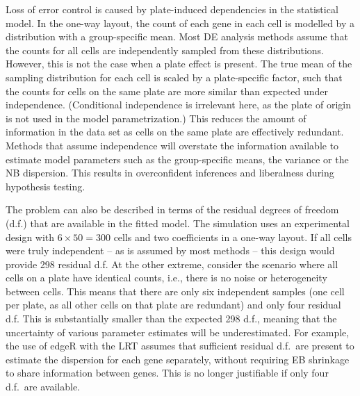 \documentclass[oupdraft]{bio}
\begin{document}
Loss of error control is caused by plate-induced dependencies in the statistical model.
In the one-way layout, the count of each gene in each cell is modelled by a distribution with a group-specific mean.
Most DE analysis methods assume that the counts for all cells are independently sampled from these distributions.
However, this is not the case when a plate effect is present.
The true mean of the sampling distribution for each cell is scaled by a plate-specific factor, 
    such that the counts for cells on the same plate are more similar than expected under independence.
(Conditional independence is irrelevant here, as the plate of origin is not used in the model parametrization.)
This reduces the amount of information in the data set as cells on the same plate are effectively redundant.
Methods that assume independence will overstate the information available to estimate model parameters such as the group-specific means, the variance or the NB dispersion.
This results in overconfident inferences and liberalness during hypothesis testing.

The problem can also be described in terms of the residual degrees of freedom (d.f.) that are available in the fitted model.
The simulation uses an experimental design with $6 \times 50 =  300$ cells and two coefficients in a one-way layout.
If all cells were truly independent -- as is assumed by most methods -- this design would provide 298 residual d.f. 
At the other extreme, consider the scenario where all cells on a plate have identical counts, i.e., there is no noise or heterogeneity between cells.
This means that there are only six independent samples (one cell per plate, as all other cells on that plate are redundant) and only four residual d.f.
This is substantially smaller than the expected 298 d.f., meaning that the uncertainty of various parameter estimates will be underestimated.
For example, the use of edgeR with the LRT assumes that sufficient residual d.f.\ are present to estimate the dispersion for each gene separately,
    without requiring EB shrinkage to share information between genes.
This is no longer justifiable if only four d.f.\ are available.
\end{document}
